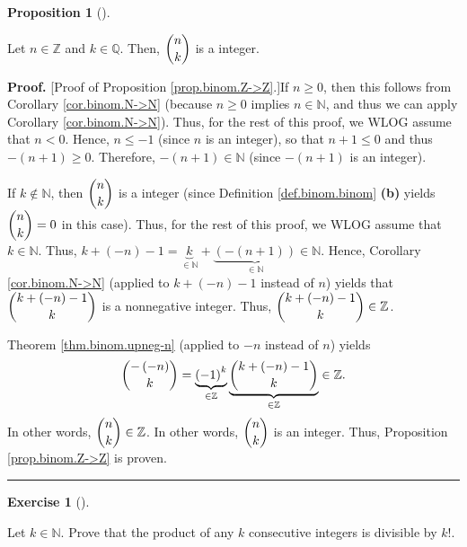 \documentclass[numbers=enddot,12pt,final,onecolumn,notitlepage]{scrartcl}%
\newcounter{exer}
\numberwithin{exer}{subsection}
\theoremstyle{definition}
\newtheorem{prop}[theo]{Proposition}
\newenvironment{proposition}[1][]
{\begin{prop}[#1]\begin{leftbar}}
{\end{leftbar}\end{prop}}
\newtheorem{exmp}[exer]{Exercise}
\newenvironment{exercise}[1][]
{\begin{exmp}[#1]\begin{leftbar}}
{\end{leftbar}\end{exmp}}
\newenvironment{proof}[1][Proof]{\noindent\textbf{#1.} }{\ \rule{0.5em}{0.5em}}
\begin{document}
\begin{proposition}
\label{prop.binom.Z->Z}Let $n\in\mathbb{Z}$ and $k\in\mathbb{Q}$. Then,
$\dbinom{n}{k}$ is a integer.
\end{proposition}

\begin{proof}
[Proof of Proposition \ref{prop.binom.Z->Z}.]If $n\geq0$, then this follows
from Corollary \ref{cor.binom.N->N} (because $n\geq0$ implies $n\in\mathbb{N}%
$, and thus we can apply Corollary \ref{cor.binom.N->N}). Thus, for the rest
of this proof, we WLOG assume that $n<0$. Hence, $n\leq-1$ (since $n$ is an
integer), so that $n+1\leq0$ and thus $-\left(  n+1\right)  \geq0$. Therefore,
$-\left(  n+1\right)  \in\mathbb{N}$ (since $-\left(  n+1\right)  $ is an integer).

If $k\notin\mathbb{N}$, then $\dbinom{n}{k}$ is a integer (since Definition
\ref{def.binom.binom} \textbf{(b)} yields $\dbinom{n}{k}=0$ in this case).
Thus, for the rest of this proof, we WLOG assume that $k\in\mathbb{N}$. Thus,
$k+\left(  -n\right)  -1=\underbrace{k}_{\in\mathbb{N}}+\underbrace{\left(
-\left(  n+1\right)  \right)  }_{\in\mathbb{N}}\in\mathbb{N}$. Hence,
Corollary \ref{cor.binom.N->N} (applied to $k+\left(  -n\right)  -1$ instead
of $n$) yields that $\dbinom{k+\left(  -n\right)  -1}{k}$ is a nonnegative
integer. Thus, $\dbinom{k+\left(  -n\right)  -1}{k}\in\mathbb{Z}$.

Theorem \ref{thm.binom.upneg-n} (applied to $-n$ instead of $n$) yields%
\[
\dbinom{-\left(  -n\right)  }{k}=\underbrace{\left(  -1\right)  ^{k}}%
_{\in\mathbb{Z}}\underbrace{\dbinom{k+\left(  -n\right)  -1}{k}}%
_{\in\mathbb{Z}}\in\mathbb{Z}.
\]
In other words, $\dbinom{n}{k}\in\mathbb{Z}$. In other words, $\dbinom{n}{k}$
is an integer. Thus, Proposition \ref{prop.binom.Z->Z} is proven.
\end{proof}

\begin{exercise}
\label{exe.binom.k!divprod}Let $k\in\mathbb{N}$. Prove that the product of any
$k$ consecutive integers is divisible by $k!$.
\end{exercise}
\end{document}
